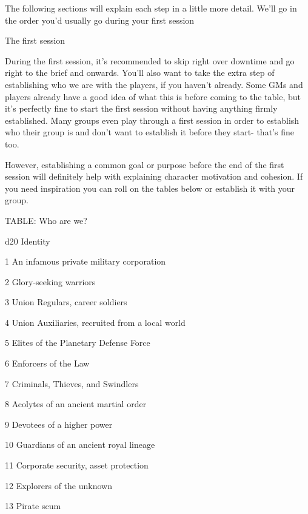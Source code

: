 The following sections will explain each step in a little more detail. We’ll go in the order you’d  
usually go during your first session
 

                                                The first session
 

During the first session, it’s recommended to skip right over downtime and go right to the brief  
and onwards. You’ll also want to take the extra step of establishing who we are with the players,  
if you haven’t already. Some GMs and players already have a good idea of what this is before  
coming to the table, but it’s perfectly fine to start the first session without having anything firmly  
established. Many groups even play through a first session in order to establish who their group  
is and don’t want to establish it before they start- that’s fine too. 
 

However, establishing a common goal or purpose before the end of the first session will definitely  
help with explaining character motivation and cohesion. If you need inspiration you can roll on  
the tables below or establish it with your group.
 

TABLE: Who are we?
 

                                                                                                                   


 d20       Identity 

 1         An infamous private military corporation 

 2         Glory-seeking warriors 

 3         Union Regulars, career soldiers 

 4         Union Auxiliaries, recruited from a local world 

 5         Elites of the Planetary Defense Force 

 6         Enforcers of the Law 

 7         Criminals, Thieves, and Swindlers 

 8         Acolytes of an ancient martial order 

 9         Devotees of a higher power 

  10       Guardians of an ancient royal lineage 

  11       Corporate security, asset protection 

  12       Explorers of the unknown 

  13       Pirate scum 

